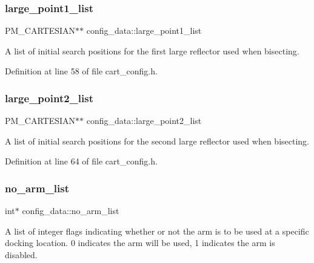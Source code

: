 \mbox{\label{structconfig__data_a7b2d512bbdc163be02d2ca8978180c34}} 
\subsubsection{\texorpdfstring{large\+\_\+point1\+\_\+list}{large\_point1\_list}}
{\footnotesize\ttfamily P\+M\+\_\+\+C\+A\+R\+T\+E\+S\+I\+AN$\ast$$\ast$ config\+\_\+data\+::large\+\_\+point1\+\_\+list}

A list of initial search positions for the first large reflector used when bisecting. 

Definition at line 58 of file cart\+\_\+config.\+h.

\mbox{\label{structconfig__data_ae7e80641b121bea61d098ee3567052f9}} 
\subsubsection{\texorpdfstring{large\+\_\+point2\+\_\+list}{large\_point2\_list}}
{\footnotesize\ttfamily P\+M\+\_\+\+C\+A\+R\+T\+E\+S\+I\+AN$\ast$$\ast$ config\+\_\+data\+::large\+\_\+point2\+\_\+list}

A list of initial search positions for the second large reflector used when bisecting. 

Definition at line 64 of file cart\+\_\+config.\+h.

\mbox{\label{structconfig__data_a05d5897890c90a80bfcc574a2691a367}} 
\subsubsection{\texorpdfstring{no\+\_\+arm\+\_\+list}{no\_arm\_list}}
{\footnotesize\ttfamily int$\ast$ config\+\_\+data\+::no\+\_\+arm\+\_\+list}

A list of integer flags indicating whether or not the arm is to be used at a specific docking location. 0 indicates the arm will be used, 1 indicates the arm is disabled. 

